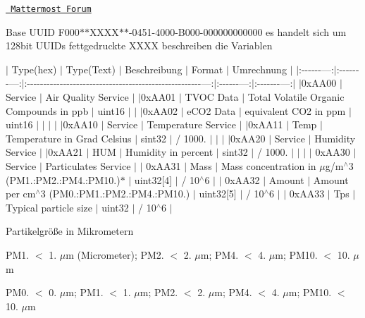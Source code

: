 \href{https://mattermost.fbi.h-da.de/pse-mayer-ss19/channels/sensorik}{\texttt{ Mattermost Forum}}

Base U\+U\+ID F000$\ast$$\ast$\+X\+X\+X\+X$\ast$$\ast$-\/0451-\/4000-\/\+B000-\/000000000000 es handelt sich um 128bit U\+U\+I\+Ds fettgedruckte X\+X\+XX beschreiben die Variablen

$\vert$ Type(hex) $\vert$ Type(\+Text) $\vert$ Beschreibung $\vert$ Format $\vert$ Umrechnung $\vert$ $\vert$\+:-\/-\/-\/-\/-\/-\/---\+:$\vert$\+:-\/-\/-\/-\/-\/-\/-\/---\+:$\vert$\+:-\/-\/-\/-\/-\/-\/-\/-\/-\/-\/-\/-\/-\/-\/-\/-\/-\/-\/-\/-\/-\/-\/-\/-\/-\/-\/-\/-\/-\/-\/-\/-\/-\/-\/-\/-\/-\/-\/-\/-\/-\/-\/-\/-\/-\/-\/-\/-\/-\/-\/-\/-\/-\/---\+:$\vert$\+:-\/-\/-\/-\/-\/-\/---\+:$\vert$\+:-\/-\/-\/-\/-\/-\/-\/---\+:$\vert$ $\vert$0x\+A\+A00 $\vert$ Service $\vert$ Air Quality Service $\vert$ $\vert$0x\+A\+A01 $\vert$ T\+V\+OC Data $\vert$ Total Volatile Organic Compounds in ppb $\vert$ uint16 $\vert$ $\vert$ $\vert$0x\+A\+A02 $\vert$ e\+C\+O2 Data $\vert$ equivalent C\+O2 in ppm $\vert$ uint16 $\vert$ $\vert$ $\vert$ $\vert$ $\vert$0x\+A\+A10 $\vert$ Service $\vert$ Temperature Service $\vert$ $\vert$0x\+A\+A11 $\vert$ Temp $\vert$ Temperature in Grad Celsius $\vert$ sint32 $\vert$ / 1000. $\vert$ $\vert$ $\vert$ $\vert$0x\+A\+A20 $\vert$ Service $\vert$ Humidity Service $\vert$ $\vert$0x\+A\+A21 $\vert$ H\+UM $\vert$ Humidity in percent $\vert$ sint32 $\vert$ / 1000. $\vert$ $\vert$ $\vert$ $\vert$ 0x\+A\+A30 $\vert$ Service $\vert$ Particulates Service $\vert$ $\vert$ 0x\+A\+A31 $\vert$ Mass $\vert$ Mass concentration in $\mu$g/m$^\wedge$3 (P\+M1.\+:P\+M2.\+:P\+M4.\+:P\+M10.)$\ast$ $\vert$ uint32\mbox{[}4\mbox{]} $\vert$ / 10$^\wedge$6 $\vert$ $\vert$ 0x\+A\+A32 $\vert$ Amount $\vert$ Amount per cm$^\wedge$3 (P\+M0.\+:P\+M1.\+:P\+M2.\+:P\+M4.\+:P\+M10.) $\vert$ uint32\mbox{[}5\mbox{]} $\vert$ / 10$^\wedge$6 $\vert$ $\vert$ 0x\+A\+A33 $\vert$ Tps $\vert$ Typical particle size $\vert$ uint32 $\vert$ / 10$^\wedge$6 $\vert$


\begin{DoxyItemize}
\item Partikelgröße in Mikrometern
\end{DoxyItemize}

P\+M1. $<$ 1. $\mu$m (Micrometer); P\+M2. $<$ 2. $\mu$m; P\+M4. $<$ 4. $\mu$m; P\+M10. $<$ 10. $\mu$m

P\+M0. $<$ 0. $\mu$m; P\+M1. $<$ 1. $\mu$m; P\+M2. $<$ 2. $\mu$m; P\+M4. $<$ 4. $\mu$m; P\+M10. $<$ 10. $\mu$m

